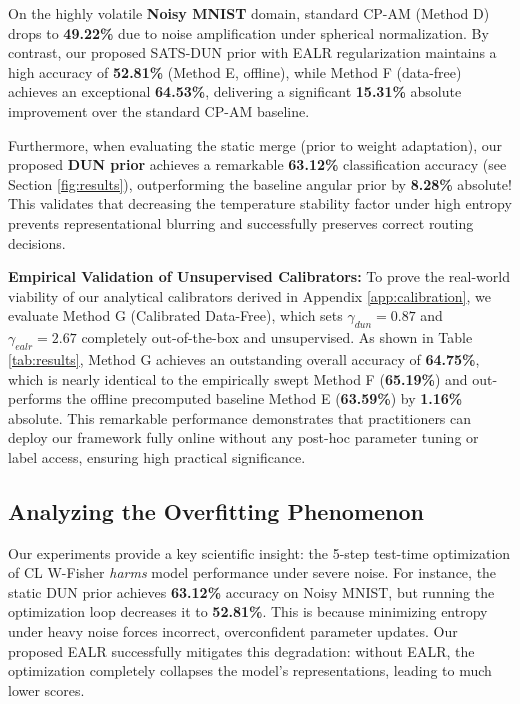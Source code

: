 \documentclass{article}
\theoremstyle{plain}
\theoremstyle{definition}
\theoremstyle{remark}
\begin{document}
On the highly volatile \textbf{Noisy MNIST} domain, standard CP-AM (Method D) drops to \textbf{49.22\%} due to noise amplification under spherical normalization. By contrast, our proposed SATS-DUN prior with EALR regularization maintains a high accuracy of \textbf{52.81\%} (Method E, offline), while Method F (data-free) achieves an exceptional \textbf{64.53\%}, delivering a significant \textbf{15.31\%} absolute improvement over the standard CP-AM baseline.

Furthermore, when evaluating the static merge (prior to weight adaptation), our proposed \textbf{DUN prior} achieves a remarkable \textbf{63.12\%} classification accuracy (see Section \ref{fig:results}), outperforming the baseline angular prior by \textbf{8.28\%} absolute! This validates that decreasing the temperature stability factor under high entropy prevents representational blurring and successfully preserves correct routing decisions.

\textbf{Empirical Validation of Unsupervised Calibrators:} To prove the real-world viability of our analytical calibrators derived in Appendix \ref{app:calibration}, we evaluate Method G (Calibrated Data-Free), which sets $\gamma_{dun} = 0.87$ and $\gamma_{ealr} = 2.67$ completely out-of-the-box and unsupervised. As shown in Table \ref{tab:results}, Method G achieves an outstanding overall accuracy of \textbf{64.75\%}, which is nearly identical to the empirically swept Method F (\textbf{65.19\%}) and out-performs the offline precomputed baseline Method E (\textbf{63.59\%}) by \textbf{1.16\%} absolute. This remarkable performance demonstrates that practitioners can deploy our framework fully online without any post-hoc parameter tuning or label access, ensuring high practical significance.

\subsection{Analyzing the Overfitting Phenomenon}
Our experiments provide a key scientific insight: the 5-step test-time optimization of CL W-Fisher \textit{harms} model performance under severe noise. For instance, the static DUN prior achieves \textbf{63.12\%} accuracy on Noisy MNIST, but running the optimization loop decreases it to \textbf{52.81\%}. This is because minimizing entropy under heavy noise forces incorrect, overconfident parameter updates. Our proposed EALR successfully mitigates this degradation: without EALR, the optimization completely collapses the model's representations, leading to much lower scores.
\end{document}

